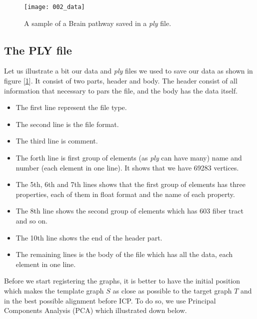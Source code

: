 \documentclass[../structure.tex]{subfiles}
\begin{document}
\begin{figure}[h!]
\centering
\texttt{[image: 002\_data]}
\captionsetup{justification=centering}
\caption{A sample of a Brain pathway saved in a \textit{ply} file.}
\label{fig:data}
\end{figure}

\subsection{The PLY file}
\hspace{2em}Let us illustrate a bit our data and \textit{ply} files we used to save our data as shown in figure [\ref{fig:data}]. It consist of two parts, header and body. The header consist of all information that necessary to pars the file, and the body has the data itself.
\begin{itemize}
\item The first line represent the file type.
\item The second line is the file format.
\item The third line is comment.
\item The forth line is first group of elements (as \textit{ply} can have many) name and number (each element in one line). It shows that we have 69283 vertices.
\item The 5th, 6th and 7th lines shows that the first group of elements has three properties, each of them in float format and the name of each property.
\item The 8th line shows the second group of elements which has 603 fiber tract and so on.
\item The 10th line shows the end of the header part.
\item The remaining lines is the body of the file which has all the data, each element in one line.
\end{itemize}

\hspace{2em}Before we start registering the graphs, it is better to have the initial position which makes the template graph $S$ as close as possible to the target graph $T$ and in the best possible alignment before ICP. To do so, we use Principal Components Analysis (PCA) which illustrated down below.
\end{document}
